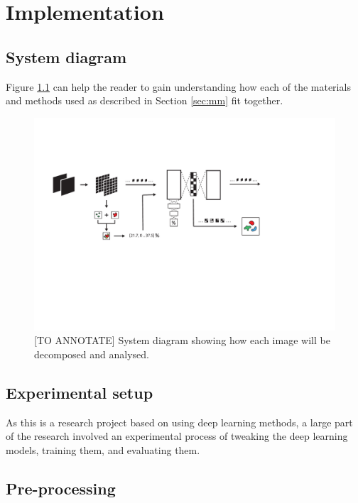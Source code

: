 

\chapter{Implementation} \label{sec:implementation}

\section{System diagram}

Figure \ref{fig:system} can help the reader to gain understanding how each of the materials and methods used as described in Section \ref{sec:mm} fit together.

\begin{figure}[h!]
    \centering
    \includegraphics[width=\textwidth]{dissertation/figures/system_diagram.pdf}
    \caption{[TO ANNOTATE] System diagram showing how each image will be decomposed and analysed.}
    \label{fig:system}
\end{figure}

\section{Experimental setup}

As this is a research project based on using deep learning methods, a large part of the research involved an experimental process of tweaking the deep learning models, training them, and evaluating them.

\section{Pre-processing}

